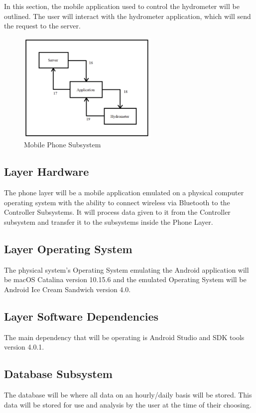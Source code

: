 In this section, the mobile application used to control the hydrometer will be outlined. The user will interact with the hydrometer application, which will send the request to the server.

\begin{figure}[h!]
	\centering
 	\includegraphics[width=0.60\textwidth]{images/mobile_phone_subsystem}
 \caption{Mobile Phone Subsystem}
\end{figure}

\subsection{Layer Hardware}
The phone layer will be a mobile application emulated on a physical computer operating system with the ability to connect wireless via Bluetooth to the Controller Subsystems. It will process data given to it from the Controller subsystem and transfer it to the subsystems inside the Phone Layer.

\subsection{Layer Operating System}
The physical system's Operating System emulating the Android application will be macOS Catalina version 10.15.6 and the emulated Operating System will be Android Ice Cream Sandwich version 4.0.

\subsection{Layer Software Dependencies}
The main dependency that will be operating is Android Studio and SDK tools version 4.0.1.

\subsection{Database Subsystem}
The database will be where all data on an hourly/daily basis will be stored. This data will be stored for use and analysis by the user at the time of their choosing.